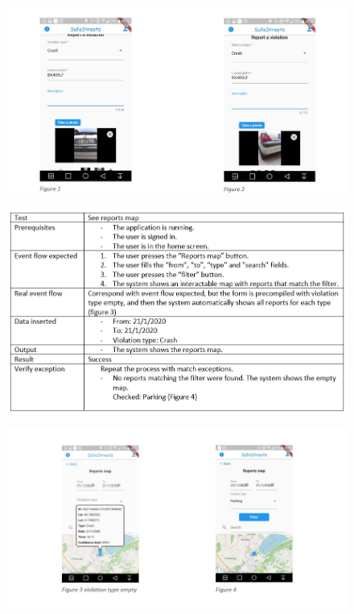 \begin{figure}[H]
\centering
\includegraphics[width=\textwidth]{Images/figure1.png}
\end{figure}
\newpage
\begin{figure}[H]
\centering
\includegraphics[width=\textwidth]{Images/seereportsmap.png}
\end{figure}
\begin{figure}[H]
\centering
\includegraphics[width=\textwidth]{Images/figure2.png}
\end{figure}









